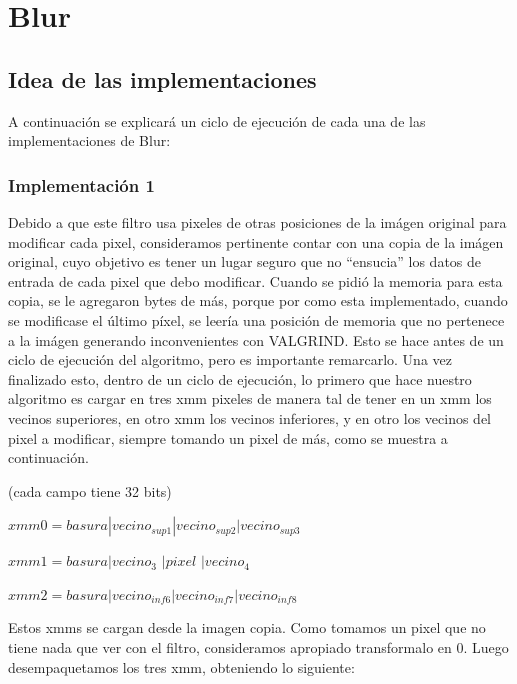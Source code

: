 \documentclass[a4paper]{article}
\begin{document}
\newpage

\section{Blur}

\subsection{Idea de las implementaciones}
A continuación se explicará un ciclo de ejecución de cada una de las implementaciones de Blur:

\subsubsection{Implementación 1}

Debido a que este filtro usa pixeles de otras posiciones de la imágen original para modificar cada pixel, consideramos pertinente contar con una copia de la imágen original, cuyo objetivo es tener un lugar seguro que no ``ensucia'' los datos de entrada de cada pixel que debo modificar. Cuando se pidió la memoria para esta copia, se le agregaron bytes de más, porque por como esta implementado, cuando se modificase el último píxel, se leería una posición de memoria que no pertenece a la imágen generando inconvenientes con VALGRIND. Esto se hace antes de un ciclo de ejecución del algoritmo, pero es importante remarcarlo. Una vez finalizado esto, dentro de un ciclo de ejecución, lo primero que hace nuestro algoritmo es cargar en tres xmm pixeles de manera tal de tener en un xmm los vecinos superiores, en otro xmm los vecinos inferiores, y en otro los vecinos del pixel a modificar, siempre tomando un pixel de más, como se muestra a continuación.
\vspace*{0.3cm}

(cada campo tiene 32 bits)

$xmm0=  basura|vecino_{sup1}|vecino_{sup2}|vecino_{sup3}$

\vspace*{0.3cm}

$xmm1=  basura|vecino_3$           $|pixel$       $|vecino_4   $

\vspace*{0.3cm}

$xmm2=  basura|vecino_{inf6}|vecino_{inf7}|vecino_{inf8}$

\vspace*{0.3cm}

Estos xmms se cargan desde la imagen copia. Como tomamos un pixel que no tiene nada que ver con el filtro, consideramos apropiado transformalo en 0. Luego desempaquetamos los tres xmm, obteniendo lo siguiente:
\end{document}
